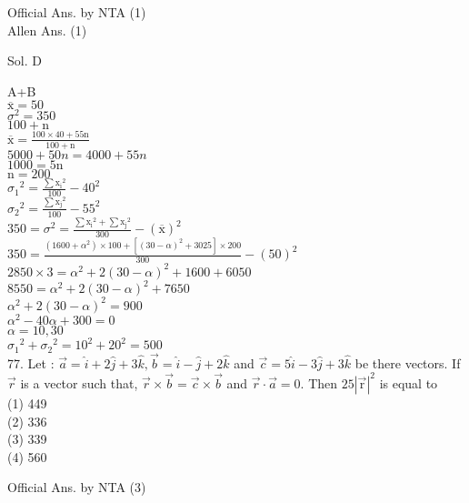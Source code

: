 \documentclass[10pt]{article}
\begin{document}
Official Ans. by NTA (1)\\
Allen Ans. (1)

Sol. D

A+B\\
\(\overline{\mathrm{x}}=50\)\\
\(\sigma^{2}=350\)\\
\(100+\mathrm{n}\)\\
\(\overline{\mathrm{x}}=\frac{100 \times 40+55 \mathrm{n}}{100+\mathrm{n}}\)\\
\(5000+50 n=4000+55 n\)\\
\(1000=5 \mathrm{n}\)\\
\(\mathrm{n}=200\)\\
\(\sigma_{1}{ }^{2}=\frac{\sum \mathrm{x}_{\mathrm{i}}{ }^{2}}{100}-40^{2}\)\\
\(\sigma_{2}{ }^{2}=\frac{\sum \mathrm{x}_{\mathrm{j}}{ }^{2}}{100}-55^{2}\)\\
\(350=\sigma^{2}=\frac{\sum \mathrm{x}_{\mathrm{i}}{ }^{2}+\sum \mathrm{x}_{\mathrm{j}}{ }^{2}}{300}-(\overline{\mathrm{x}})^{2}\)\\
\(350=\frac{\left(1600+\alpha^{2}\right) \times 100+\left[(30-\alpha)^{2}+3025\right] \times 200}{300}-(50)^{2}\)\\
\(2850 \times 3=\alpha^{2}+2(30-\alpha)^{2}+1600+6050\)\\
\(8550=\alpha^{2}+2(30-\alpha)^{2}+7650\)\\
\(\alpha^{2}+2(30-\alpha)^{2}=900\)\\
\(\alpha^{2}-40 \alpha+300=0\)\\
\(\alpha=10,30\)\\
\(\sigma_{1}{ }^{2}+\sigma_{2}{ }^{2}=10^{2}+20^{2}=500\)\\
77. Let : \(\vec{a}=\hat{i}+2 \hat{j}+3 \hat{k}, \vec{b}=\hat{i}-\hat{j}+2 \hat{k}\) and \(\vec{c}=5 \hat{i}-3 \hat{j}+3 \hat{k}\) be there vectors. If \(\vec{r}\) is a vector such that, \(\vec{r} \times \vec{b}=\vec{c} \times \vec{b}\) and \(\vec{r} \cdot \vec{a}=0\). Then \(25|\overrightarrow{\mathrm{r}}|^{2}\) is equal to\\
(1) 449\\
(2) 336\\
(3) 339\\
(4) 560

Official Ans. by NTA (3)
\end{document}
